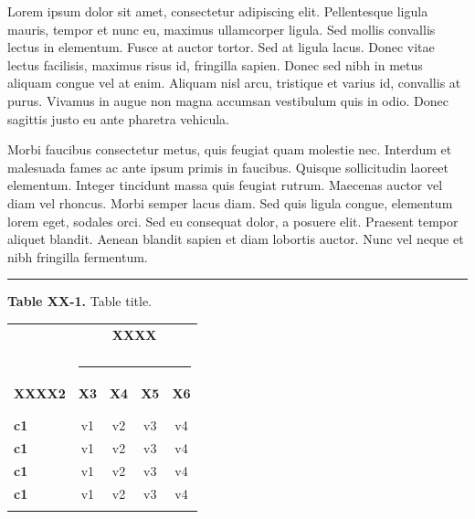 \begin{multicols}{2}


 Lorem ipsum dolor sit amet, consectetur adipiscing elit. Pellentesque ligula 
mauris, tempor et nunc eu, maximus ullamcorper ligula. Sed mollis convallis 
lectus in elementum. Fusce at auctor tortor. Sed at ligula lacus. Donec vitae 
lectus facilisis, maximus risus id, fringilla sapien. Donec sed nibh in metus 
aliquam congue vel at enim. Aliquam nisl arcu, tristique et varius id, convallis 
at purus. Vivamus in augue non magna accumsan vestibulum quis in odio. Donec 
sagittis justo eu ante pharetra vehicula.

Morbi faucibus consectetur metus, quis feugiat quam molestie nec. Interdum et 
malesuada fames ac ante ipsum primis in faucibus. Quisque sollicitudin laoreet 
elementum. Integer tincidunt massa quis feugiat rutrum. Maecenas auctor vel diam 
vel rhoncus. Morbi semper lacus diam. Sed quis ligula congue, elementum lorem 
eget, sodales orci. Sed eu consequat dolor, a posuere elit. Praesent tempor 
aliquet blandit. Aenean blandit sapien et diam lobortis auctor. Nunc vel neque 
et nibh fringilla fermentum. 

\begin{table}[H]
\rule{0.49\textwidth}{1.0pt}

\noindent \textbf{Table XX-1.} \small{Table title.} 
 \begin{center}
 \begin{adjustbox}{max width=0.49\textwidth}
 \begin{tabular}[c]{lcccc}

  & \multicolumn{4}{c}{\textbf{\Large{XXXX}}} \\
  \vspace{-0.4cm}\\
  & \multicolumn{4}{c}{\rule{35mm}{0.5mm}} \\
  
  \textbf{\Large{XXXX2}} & \textbf{\Large{X3}} & \textbf{\Large{X4}} & 
\textbf{\Large{X5}} & \textbf{\Large{X6}}\\
  \vspace{-10.0pt}\\
  \hline
  \vspace{-10.0pt}\\
  \textbf{c1}     &  v1 & v2  & v3 &  v4 \\
  \textbf{c1}     &  v1 & v2  & v3 &  v4 \\
  \textbf{c1}     &  v1 & v2  & v3 &  v4 \\
  \textbf{c1}     &  v1 & v2  & v3 &  v4 \\
  \vspace{-10.0pt}\\
  \hline
 \end{tabular}
 \end{adjustbox}
 \end{center}
\end{table}



\end{multicols}
